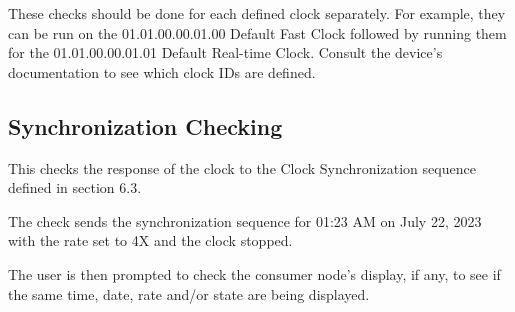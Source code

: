 These checks should be done for each defined clock separately. 
For example, they can be run on the 01.01.00.00.01.00 Default Fast Clock
followed by running them for the 01.01.00.00.01.01 Default Real-time Clock.
Consult the device's documentation to see which clock IDs are defined.

\subsection{Synchronization Checking}

This checks the response of the clock to the Clock Synchronization sequence defined
in section 6.3.

The check sends the synchronization sequence for 
    01:23 AM on July 22, 2023 with the rate set to 4X and the clock stopped.
    
The user is then prompted to check the consumer node's display, if any, to see if the
same time, date, rate and/or state are being displayed.



  
